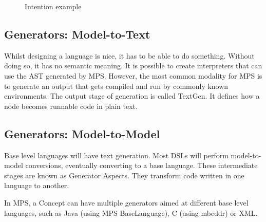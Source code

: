 \begin{figure}[h]
    \centering
    \caption{Intention example}
    \label{fig:intention_example}
\end{figure}

\subsection{Generators: Model-to-Text}
Whilst designing a language is nice, it has to be able to do something. 
Without doing so, it has no semantic meaning.
It is possible to create interpreters that can use the AST generated by MPS.
However, the most common modality for MPS is to generate an output that gets compiled and run by commonly known environments.
The output stage of generation is called TextGen.
It defines how a node becomes runnable code in plain text.

\subsection{Generators: Model-to-Model}
Base level languages will have text generation.
Most DSLs will perform model-to-model conversions, eventually converting to a base language.
These intermediate stages are known as Generator Aspects.
They transform code written in one language to another.

In MPS, a Concept can have multiple generators aimed at different base level languages, such as Java (using MPS BaseLanguage), C (using mbeddr) or XML.